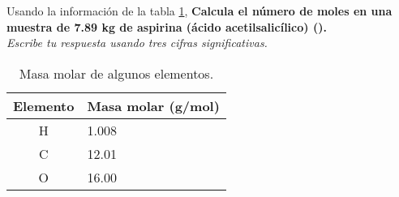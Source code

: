 Usando la información de la tabla \ref{tab:q002},
\textbf{Calcula el número de moles en una muestra de 7.89 kg de aspirina (ácido acetilsalicílico) ().}\\
\emph{Escribe tu respuesta usando tres cifras significativas.}

\begin{multicols}{2}
    \begin{table}[H]
        \centering
        \caption{Masa molar de algunos elementos.}
        \label{tab:q002}
        \begin{tabular}{c|p{2.2cm}}
            \textbf{Elemento} & \textbf{Masa molar (g/mol)} \\\midrule
            H                 & 1.008                       \\\hline
            C                 & 12.01                       \\\hline
            O                 & 16.00                       \\\hline
            \bottomrule
        \end{tabular}
    \end{table}

    \columnbreak

    \begin{solutionbox}{7cm}
    \end{solutionbox}
\end{multicols}
